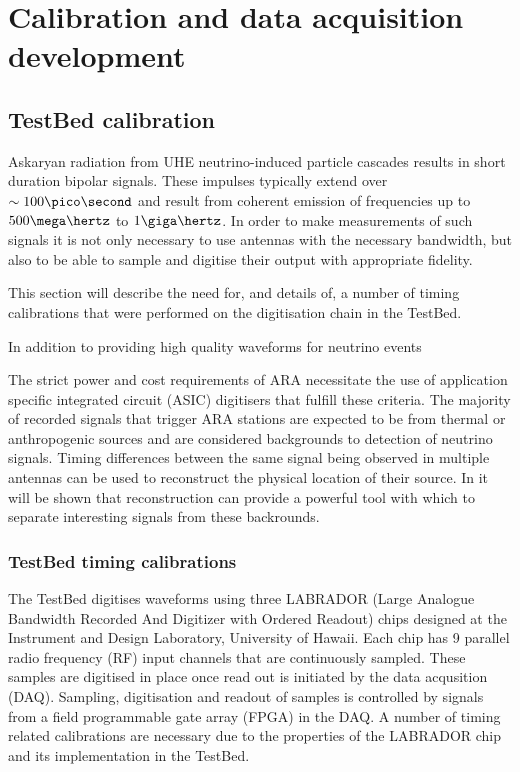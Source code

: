 \chapter{Calibration and data acquisition development}
\label{chap:Calibration}


\section{TestBed calibration}
\label{sec:calibration:TestBed-calibration}

Askaryan radiation from UHE neutrino-induced particle cascades results in short duration bipolar signals. These impulses typically extend over $\sim 100 \pico \second$ and result from coherent emission of frequencies up to $500 \mega \hertz$ to $1 \giga \hertz$. In order to make measurements of such signals it is not only necessary to use antennas with the necessary bandwidth, but also to be able to sample and digitise their output with appropriate fidelity. 


This section will describe the need for, and details of, a number of timing calibrations that were performed on the digitisation chain in the TestBed.

In addition to providing high quality waveforms for neutrino events 




The strict power and cost requirements of ARA necessitate the use of application specific integrated circuit (ASIC) digitisers that fulfill these criteria. The majority of recorded signals that trigger ARA stations are expected to be from thermal or anthropogenic sources and are considered backgrounds to detection of neutrino signals. Timing differences between the same signal being observed in multiple antennas can be used to reconstruct the physical location of their source. In  it will be shown that reconstruction can provide a powerful tool with which to separate interesting signals from these backrounds. 


\subsection{TestBed timing calibrations}
\label{sec:calibration:LABRADOR-Digitiser-Chip}

The TestBed digitises waveforms using three LABRADOR (Large Analogue Bandwidth Recorded And Digitizer with Ordered Readout) chips designed at the Instrument and Design Laboratory, University of Hawaii. Each chip has 9 parallel radio frequency (RF) input channels that are continuously sampled. These samples are digitised in place once read out is initiated by the data acqusition (DAQ). Sampling, digitisation and readout of samples is controlled by signals from a field programmable gate array (FPGA) in the DAQ. A number of timing related calibrations are necessary due to the properties of the LABRADOR chip and its implementation in the TestBed. 

